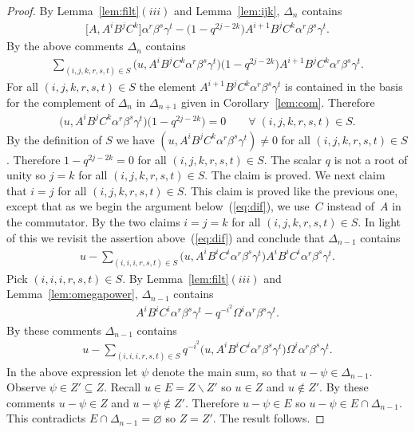 \documentclass[11pt]{article}
\numberwithin{equation}{section}
\begin{document}
\begin{proof}
By
Lemma~\ref{lem:filt}$(iii)$ and
Lemma~\ref{lem:ijk}, $\Delta_n$ contains
\begin{gather*}
\big\lbrack A, A^iB^jC^k \big\rbrack
\alpha^r \beta^s \gamma^t
-
\big(1-q^{2j-2k}\big)  A^{i+1}B^jC^k
\alpha^r \beta^s \gamma^t.
\end{gather*}
By the above comments
$\Delta_n$ contains
\begin{gather*}
\sum_{
(i,j,k,r,s,t) \in S}
\big(u, A^iB^jC^k
\alpha^r \beta^s \gamma^t \big)
\big(1-q^{2j-2k}\big)  A^{i+1}B^jC^k
\alpha^r \beta^s \gamma^t.
\end{gather*}
For all
$(i,j,k,r,s,t) \in S$
the element
$A^{i+1}B^jC^k
\alpha^r \beta^s \gamma^t$
is contained
in the basis for the complement of $\Delta_n$ in $\Delta_{n+1}$
given in Corollary~\ref{lem:com}. Therefore
\begin{gather*}
\big(u, A^iB^jC^k
\alpha^r \beta^s \gamma^t\big)
\big(1-q^{2j-2k}\big)  = 0
\qquad
\forall \;(i,j,k,r,s,t) \in S.
\end{gather*}
By the def\/inition of $S$ we have
$( u, A^iB^jC^k
\alpha^r \beta^s \gamma^t )\not=0$
 for
all
$(i,j,k,r,s,t) \in S$.
Therefore
$1-q^{2j-2k} = 0 $ for all
$(i,j,k,r,s,t) \in S$.
The scalar $q$ is not a root of unity
so $j=k$ for all
$(i,j,k,r,s,t) \in S$.
The claim is proved.
We next claim that
$i=j$ for all
$(i,j,k,r,s,t) \in S$.
This claim is proved like the previous one,
 except that
as we begin the argument below~(\ref{eq:dif}),
we use~$C$ instead of~$A$ in the commutator.
By the two claims
$i=j=k$ for all
$(i,j,k,r,s,t) \in S$.
In light of this we revisit the assertion above~(\ref{eq:dif}) and conclude that
$\Delta_{n-1}$ contains
\begin{gather*}
u-\sum_{
(i,i,i,r,s,t) \in S}
\big(u, A^iB^iC^i
\alpha^r \beta^s \gamma^t \big)
A^{i}B^iC^i
\alpha^r \beta^s \gamma^t.
\end{gather*}
Pick
$(i,i,i,r,s,t) \in S$.
By
Lemma~\ref{lem:filt}$(iii)$ and
Lemma~\ref{lem:omegapower},
$\Delta_{n-1}$ contains
\begin{gather*}
A^iB^iC^i
\alpha^r \beta^s \gamma^t
-q^{-i^2}\Omega^i \alpha^r \beta^s \gamma^t.
\end{gather*}
By these comments
$\Delta_{n-1}$ contains
\begin{gather*}
\label{eq:summ}
u-
\sum_{
(i,i,i,r,s,t) \in S}
q^{-i^2}
\big(u, A^iB^iC^i
\alpha^r \beta^s \gamma^t  \big)
\Omega^i \alpha^r \beta^s \gamma^t.
\end{gather*}
In the above expression let
$\psi$ denote the main sum,
so that
$u-\psi \in \Delta_{n-1}$.
Observe
$\psi \in Z' \subseteq Z$.
Recall $u \in E=Z\backslash Z'$ so
$u \in Z$ and $u \not\in Z'$. By these comments
$u - \psi \in Z$ and
$u - \psi \not\in Z'$.
Therefore $u - \psi \in E$ so
 $u - \psi \in E\cap \Delta_{n-1}$.
This contradicts
 $E\cap \Delta_{n-1}=\varnothing $ so
$Z=Z'$. The result follows.
\end{proof}
\end{document}

